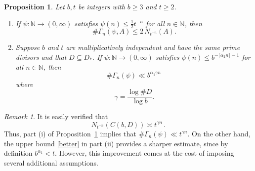 \documentclass[12pt]{article}
\newtheorem{proposition}{Proposition}[section]
\theoremstyle{definition}
\theoremstyle{remark}
\newtheorem{remark}{{Remark}}[section]
\newcommand{\red}[1]{\textcolor[rgb]{1.00,0.00,0.00}{#1}}
\newcommand{\sv}[1]{{\color{blue}   {#1}}}
\begin{document}
\begin{proposition}\label{ub}
Let $b,t$ be integers with $b\geq3$ and $t\geq2$.
\begin{enumerate}
\item[(i)] If $\psi:\mathbb{N}\to(0,\infty)$ satisfies $\psi(n)\leq\frac{1}{2}t^{-n}$ for all $n\in\mathbb{N}$, then
$$\#\Gamma_n (\psi,A)  \le 2  \,   N_{t^{-n}}(A).    $$ 
\item[(ii)] Suppose $b$ and $t$ are multiplicatively independent and have the same prime divisors 
and that $D\subseteq D_{*}$.
If $\psi:\mathbb{N}\to(0,\infty)$ satisfies $\psi(n)\leq b^{-\lceil\alpha_{2}n\rceil-1}$ for all $n\in\mathbb{N}$, then
\begin{equation} \label{better}
    \#\Gamma_n (\psi)\ll b^{\alpha_{1}\gamma n}  \, 
\end{equation}
where
$$\gamma=\frac{\log\#D}{\log b}.$$
\end{enumerate}
\end{proposition}
\begin{remark}
It is easily verified that  
$$N_{t^{-n}}(C(b,D))\asymp t^{\gamma n}   \, . $$ Thus,   part (i) of Proposition~\ref{ub} implies that $\#\Gamma_n (\psi)\ll t^{\gamma n}$. On the other hand,     the upper bound  \eqref{better} in  part (ii) provides a sharper estimate,  since by definition $b^{\alpha_{1}}<t$.  
However, this improvement comes at the cost of imposing several additional assumptions.


\end{remark}



\end{document}
